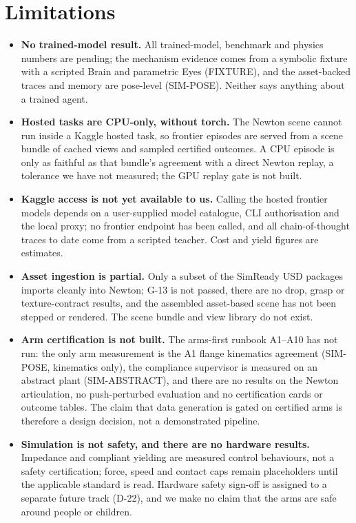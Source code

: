 \section{Limitations}\label{sec:limits}
\begin{itemize}[leftmargin=*,itemsep=1pt]
\item \textbf{No trained-model result.} All trained-model, benchmark and physics numbers are pending; the mechanism evidence comes from a symbolic fixture with a scripted Brain and parametric Eyes (FIXTURE), and the asset-backed traces and memory are pose-level (SIM-POSE). Neither says anything about a trained agent.
\item \textbf{Hosted tasks are CPU-only, without torch.} The Newton scene cannot run inside a Kaggle hosted task, so frontier episodes are served from a scene bundle of cached views and sampled certified outcomes. A CPU episode is only as faithful as that bundle's agreement with a direct Newton replay, a tolerance we have not measured; the GPU replay gate is not built.
\item \textbf{Kaggle access is not yet available to us.} Calling the hosted frontier models depends on a user-supplied model catalogue, CLI authorisation and the local proxy; no frontier endpoint has been called, and all chain-of-thought traces to date come from a scripted teacher. Cost and yield figures are estimates.
\item \textbf{Asset ingestion is partial.} Only a subset of the SimReady USD packages imports cleanly into Newton; G-13 is not passed, there are no drop, grasp or texture-contract results, and the assembled asset-based scene has not been stepped or rendered. The scene bundle and view library do not exist.
\item \textbf{Arm certification is not built.} The arms-first runbook A1--A10 has not run: the only arm measurement is the A1 flange kinematics agreement (SIM-POSE, kinematics only), the compliance supervisor is measured on an abstract plant (SIM-ABSTRACT), and there are no results on the Newton articulation, no push-perturbed evaluation and no certification cards or outcome tables. The claim that data generation is gated on certified arms is therefore a design decision, not a demonstrated pipeline.
\item \textbf{Simulation is not safety, and there are no hardware results.} Impedance and compliant yielding are measured control behaviours, not a safety certification; force, speed and contact caps remain placeholders until the applicable standard is read. Hardware safety sign-off is assigned to a separate future track (D-22), and we make no claim that the arms are safe around people or children.

\end{itemize}
